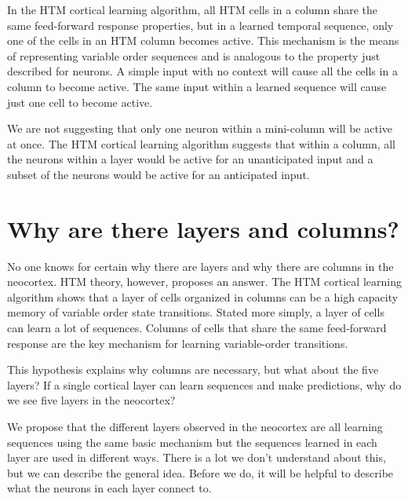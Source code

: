\documentclass{report}
\begin{document}
In the HTM cortical learning algorithm, all HTM cells in a column
share the same feed-forward response properties, but in a learned
temporal sequence, only one of the cells in an HTM column becomes
active. This mechanism is the means of representing variable order
sequences and is analogous to the property just described for
neurons. A simple input with no context will cause all the cells in a
column to become active. The same input within a learned sequence will
cause just one cell to become active.

We are not suggesting that only one neuron within a mini-column will
be active at once. The HTM cortical learning algorithm suggests that
within a column, all the neurons within a layer would be active for an
unanticipated input and a subset of the neurons would be active for an
anticipated input.

\section*{Why are there layers and columns?}

No one knows for certain why there are layers and why there are
columns in the neocortex. HTM theory, however, proposes an answer. The
HTM cortical learning algorithm shows that a layer of cells organized
in columns can be a high capacity memory of variable order state
transitions. Stated more simply, a layer of cells can learn a lot of
sequences. Columns of cells that share the same feed-forward response
are the key mechanism for learning variable-order transitions.

This hypothesis explains why columns are necessary, but what about the
five layers? If a single cortical layer can learn sequences and make
predictions, why do we see five layers in the neocortex?

We propose that the different layers observed in the neocortex are all
learning sequences using the same basic mechanism but the sequences
learned in each layer are used in different ways. There is a lot we
don't understand about this, but we can describe the general
idea. Before we do, it will be helpful to describe what the neurons in
each layer connect to.

\begin{figure}
\end{figure}
\end{document}
